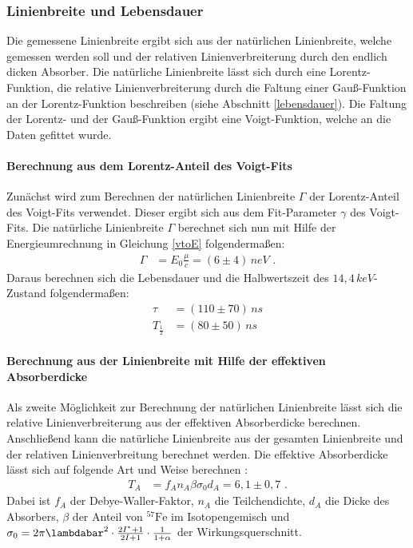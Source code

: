 \subsubsection{Linienbreite und Lebensdauer}
Die gemessene Linienbreite ergibt sich aus der natürlichen Linienbreite, welche gemessen werden soll und der relativen Linienverbreiterung durch den endlich dicken Absorber. Die natürliche Linienbreite lässt sich durch eine Lorentz-Funktion, die relative Linienverbreiterung durch die Faltung einer Gauß-Funktion an der Lorentz-Funktion beschreiben (siehe Abschnitt \ref{lebensdauer}). Die Faltung der Lorentz- und der Gauß-Funktion ergibt eine Voigt-Funktion, welche an die Daten gefittet wurde.
\paragraph{Berechnung aus dem Lorentz-Anteil des Voigt-Fits}
Zunächst wird zum Berechnen der natürlichen Linienbreite $\Gamma$ der Lorentz-Anteil des Voigt-Fits verwendet. Dieser ergibt sich aus dem Fit-Parameter $\gamma$ des Voigt-Fits. Die natürliche Linienbreite $\Gamma$ berechnet sich nun mit Hilfe der Energieumrechnung in Gleichung \ref{vtoE} folgendermaßen:
\begin{align}
	\Gamma&=E_0\frac{\mu}{c}=(6\pm4)\,\si{neV}\text{ .}
\end{align}
Daraus berechnen sich die Lebensdauer und die Halbwertszeit des $14,4\,\si{keV}$-Zustand folgendermaßen:
\begin{align}
	\tau&=(110\pm70)\,\si{ns}\\
	T_{\frac12}&=(80\pm50)\,\si{ns}
\end{align}
\paragraph{Berechnung aus der Linienbreite mit Hilfe der effektiven Absorberdicke}
Als zweite Möglichkeit zur Berechnung der natürlichen Linienbreite lässt sich die relative Linienverbreiterung aus der effektiven Absorberdicke berechnen. Anschließend kann die natürliche Linienbreite aus der gesamten Linienbreite und der relativen Linienverbreitung berechnet werden. Die effektive Absorberdicke lässt sich auf folgende Art und Weise berechnen \cite{anleitung}:
\begin{align}
	T_A&=f_An_A\beta\sigma_0d_A=6,1\pm0,7\text{ .}
\end{align}
Dabei ist $f_A$ der Debye-Waller-Faktor, $n_A$ die Teilchendichte, $d_A$ die Dicke des Absorbers, $\beta$ der Anteil von $^{57}\mathrm{Fe}$ im Isotopengemisch und $\sigma_0=2\pi\lambdabar^2\cdot\frac{2I^*+1}{2I+1}\cdot\frac1{1+\alpha}$ der Wirkungsquerschnitt.\\


